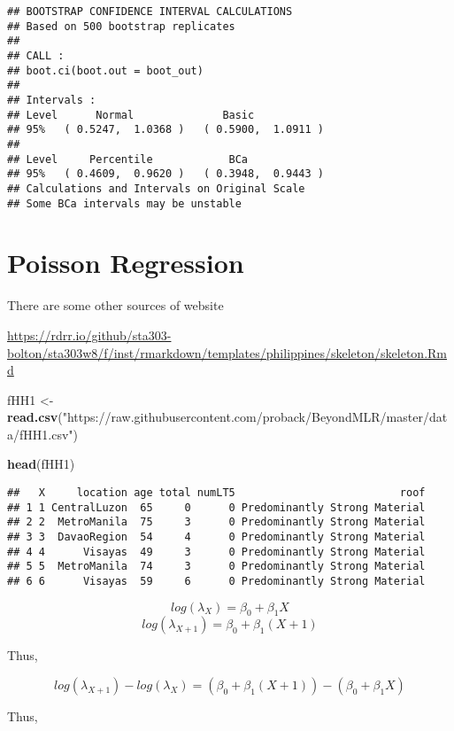\documentclass[]{book}
\newenvironment{Shaded}{\begin{snugshade}}{\end{snugshade}}
\newcommand{\KeywordTok}[1]{\textcolor[rgb]{0.13,0.29,0.53}{\textbf{#1}}}
\newcommand{\NormalTok}[1]{#1}
\newcommand{\StringTok}[1]{\textcolor[rgb]{0.31,0.60,0.02}{#1}}
\begin{document}
\begin{verbatim}
## BOOTSTRAP CONFIDENCE INTERVAL CALCULATIONS
## Based on 500 bootstrap replicates
## 
## CALL : 
## boot.ci(boot.out = boot_out)
## 
## Intervals : 
## Level      Normal              Basic         
## 95%   ( 0.5247,  1.0368 )   ( 0.5900,  1.0911 )  
## 
## Level     Percentile            BCa          
## 95%   ( 0.4609,  0.9620 )   ( 0.3948,  0.9443 )  
## Calculations and Intervals on Original Scale
## Some BCa intervals may be unstable
\end{verbatim}

\hypertarget{poisson-regression}{%
\chapter{Poisson Regression}\label{poisson-regression}}

There are some other sources of website

\url{https://rdrr.io/github/sta303-bolton/sta303w8/f/inst/rmarkdown/templates/philippines/skeleton/skeleton.Rmd}

\begin{Shaded}
\begin{Highlighting}[]
\NormalTok{fHH1 <-}\StringTok{ }\KeywordTok{read.csv}\NormalTok{(}\StringTok{"https://raw.githubusercontent.com/proback/BeyondMLR/master/data/fHH1.csv"}\NormalTok{)}

\KeywordTok{head}\NormalTok{(fHH1)}
\end{Highlighting}
\end{Shaded}

\begin{verbatim}
##   X     location age total numLT5                          roof
## 1 1 CentralLuzon  65     0      0 Predominantly Strong Material
## 2 2  MetroManila  75     3      0 Predominantly Strong Material
## 3 3  DavaoRegion  54     4      0 Predominantly Strong Material
## 4 4      Visayas  49     3      0 Predominantly Strong Material
## 5 5  MetroManila  74     3      0 Predominantly Strong Material
## 6 6      Visayas  59     6      0 Predominantly Strong Material
\end{verbatim}

\[log (\lambda_X) =\beta_0+\beta_1 X\]
\[log (\lambda_{X+1}) =\beta_0+\beta_1 (X+1)\]

Thus,

\[log (\lambda_{X+1})-log (\lambda_X) =(\beta_0+\beta_1 (X+1))-(\beta_0+\beta_1 X)\]

Thus,
\end{document}
